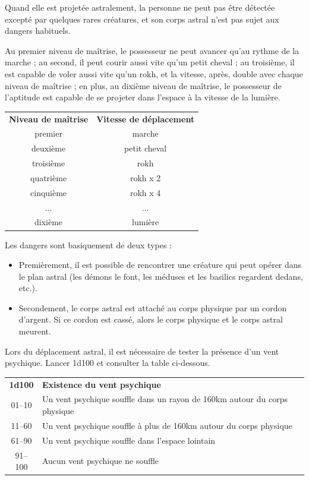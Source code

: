 \documentclass[11pt]{article}
\begin{document}
{\bigskip

Quand elle est projetée astralement, la personne ne peut pas être détectée excepté par quelques rares créatures, et son corps astral n'est pas sujet aux dangers habituels.

\bigskip

Au premier niveau de maîtrise, le possesseur ne peut avancer qu'au rythme de la marche ; au second, il peut courir aussi vite qu'un petit cheval ; au troisième, il est capable de voler aussi vite qu'un rokh, et la vitesse, après, double avec chaque niveau de maîtrise ; en plus, au dixième niveau de maîtrise, le possesseur de l'aptitude est capable de se projeter dans l'espace à la vitesse de la lumière.

\bigskip
\begin{tabular}{cc}
\textbf{Niveau de maîtrise} & \textbf{Vitesse de déplacement} \\
premier     & marche \\
deuxième    & petit cheval \\
troisième   & rokh \\
quatrième   & rokh x 2 \\
cinquième   & rokh x 4 \\
...         & ... \\
dixième     & lumière \\
\end{tabular}

\bigskip

Les dangers sont basiquement de deux types :

\bigskip

\begin{itemize}
\item Premièrement, il est possible de rencontrer une créature qui peut opérer dans le plan astral (les démons le font, les méduses et les basilics regardent dedans, etc.).
\item Secondement, le corps astral est attaché au corps physique par un cordon d'argent. Si ce cordon est cassé, alors le corps physique et le corps astral meurent.
\end{itemize}

\bigskip

Lors du déplacement astral, il est nécessaire de tester la présence d'un vent psychique. Lancer 1d100 et consulter la table ci-dessous.

\bigskip

\begin{tabular}{cl}
\textbf{1d100} & \textbf{Existence du vent psychique} \\
01--10 & Un vent psychique souffle dans un rayon de 160km autour du corps physique \\
11--60 & Un vent psychique souffle à plus de 160km autour du corps physique \\
61--90 & Un vent psychique souffle dans l'espace lointain \\
91--100 & Aucun vent psychique ne souffle \\
\end{tabular}

}
\end{document}
